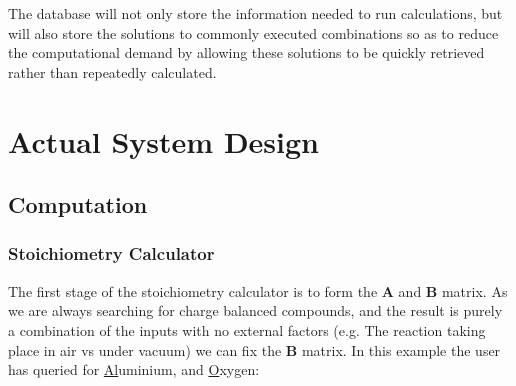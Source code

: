 The database will not only store the information needed to run calculations, but will also store the solutions to commonly executed combinations so as to reduce the computational demand by allowing these solutions to be quickly retrieved rather than repeatedly calculated.

\section{Actual System Design}
\subsection{Computation}
\subsubsection{Stoichiometry Calculator}
The first stage of the stoichiometry calculator is to form the $\mathbf{A}$ and $\mathbf{B}$ matrix. As we are always searching for charge balanced compounds, and the result is purely a combination of the inputs with no external factors (e.g. The reaction taking place in air vs under vacuum) we can fix the $\mathbf{B}$ matrix. In this example the user has queried for \underline{Al}uminium, and \underline{O}xygen:

